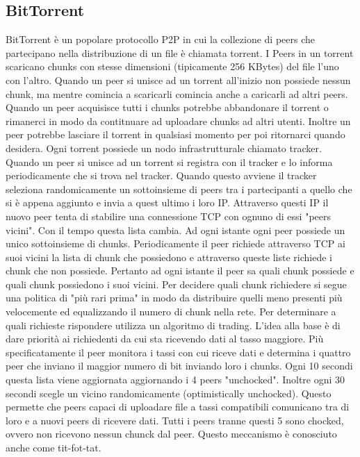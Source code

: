 \subsection{BitTorrent}
BitTorrent \`e un popolare protocollo P2P in cui la collezione di peers che partecipano nella distribuzione di un file \`e chiamata torrent. I Peers in un
torrent scaricano chunks con stesse dimensioni (tipicamente 256 KBytes) del file l'uno con l'altro. Quando un peer si unisce ad un torrent all'inizio non
possiede nessun chunk, ma mentre comincia a scaricarli comincia anche a caricarli ad altri peers. Quando un peer acquisisce tutti i chunks potrebbe 
abbandonare il torrent o rimanerci in modo da contitnuare ad uploadare chunks ad altri utenti. Inoltre un peer potrebbe lasciare il torrent in qualsiasi 
momento per poi ritornarci quando desidera. Ogni torrent possiede un nodo infrastrutturale chiamato tracker. Quando un peer si unisce ad un torrent si 
registra con il tracker e lo informa periodicamente che si trova nel tracker. Quando questo avviene il tracker seleziona randomicamente un sottoinsieme di
peers tra i partecipanti a quello che si \`e appena aggiunto e invia a quest ultimo i loro IP. Attraverso questi IP il nuovo peer tenta di stabilire una
connessione TCP con ognuno di essi "peers vicini". Con il tempo questa lista cambia. Ad ogni istante ogni peer possiede un unico sottoinsieme di chunks. 
Periodicamente il peer richiede attraverso TCP ai suoi vicini la lista di chunk che possiedono e attraverso queste liste richiede i chunk che non possiede.
Pertanto ad ogni istante il peer sa quali chunk possiede e quali chunk possiedono i suoi vicini. Per decidere quali chunk richiedere si segue una politica
di "pi\`u rari prima" in modo da distribuire quelli meno presenti pi\`u velocemente ed equalizzando il numero di chunk nella rete. Per determinare a quali
richieste rispondere utilizza un algoritmo di trading. L'idea alla base \`e di dare priorit\`a ai richiedenti da cui sta ricevendo dati al tasso maggiore. 
Pi\`u specificatamente il peer monitora i tassi con cui riceve dati e determina i quattro peer che inviano il maggior numero di bit inviando loro i chunks.
Ogni 10 secondi questa lista viene aggiornata aggiornando i 4 peers "unchocked". Inoltre ogni 30 secondi scegle un vicino randomicamente (optimistically 
unchocked). Questo permette che peers capaci di uploadare file a tassi compatibili comunicano tra di loro e a nuovi peers di ricevere dati. Tutti i peers
tranne questi 5 sono chocked, ovvero non ricevono nessun chunck dal peer. Questo meccanismo \`e conosciuto anche come tit-fot-tat.
